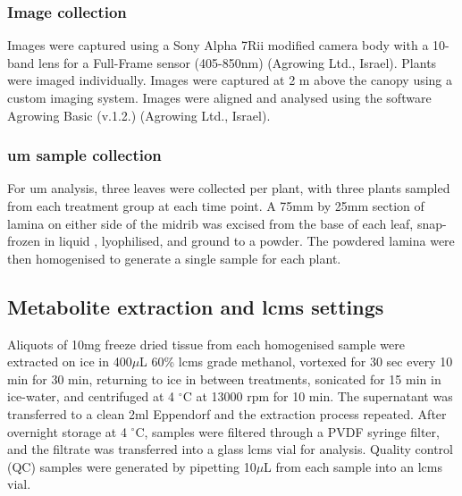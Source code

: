 \subsubsection{Image collection}
Images were captured using a Sony Alpha 7Rii modified camera body with a 10-band lens for a Full-Frame sensor (405-850nm) (Agrowing Ltd., Israel). Plants were imaged individually. Images were captured at 2 m above the canopy using a custom imaging system. Images were aligned and analysed using the software Agrowing Basic (v.1.2.) (Agrowing Ltd., Israel). 

\subsubsection{\Acl{um} sample collection}
For \ac{um} analysis, three leaves were collected per plant, with three plants sampled from each treatment group at each time point. A 75mm by 25mm section of lamina on either side of the midrib was excised from the base of each leaf, snap-frozen in liquid , lyophilised, and ground to a powder. The powdered lamina were then homogenised to generate a single sample for each plant. 



\subsection{Metabolite extraction and \ac{lcms} settings}
Aliquots of 10mg freeze dried tissue from each homogenised sample were extracted on ice in 400\(\mu\)L 60\% \ac{lcms} grade methanol, vortexed for 30 sec every 10 min for 30 min, returning to ice in between treatments, sonicated for 15 min in ice-water, and centrifuged at 4 $^{\circ}$C at 13000 \ac{rpm} for 10 min. The supernatant was transferred to a clean 2ml Eppendorf and the extraction process repeated. After overnight storage at 4 $^{\circ}$C, samples were filtered through a PVDF syringe filter, and the filtrate was transferred into a glass \ac{lcms} vial for analysis. Quality control (QC) samples were generated by pipetting 10\(\mu\)L from each sample into an \ac{lcms} vial. 


